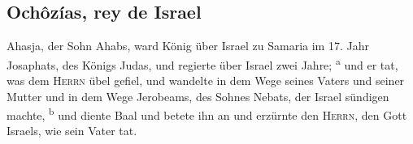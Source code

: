 \hypertarget{ochuxf4zuxedas-rey-de-israel}{%
\subsection{Ochôzías, rey de
Israel}\label{ochuxf4zuxedas-rey-de-israel}}

 Ahasja, der Sohn Ahabs, ward König über Israel zu
Samaria im 17. Jahr Josaphats, des Königs Judas, und regierte über
Israel zwei Jahre; \textsuperscript{a}  und er tat, was
dem \textsc{Herrn} übel gefiel, und wandelte in dem Wege seines Vaters
und seiner Mutter und in dem Wege Jerobeams, des Sohnes Nebats, der
Israel sündigen machte, \textsuperscript{b}  und diente
Baal und betete ihn an und erzürnte den \textsc{Herrn}, den Gott
Israels, wie sein Vater tat.
